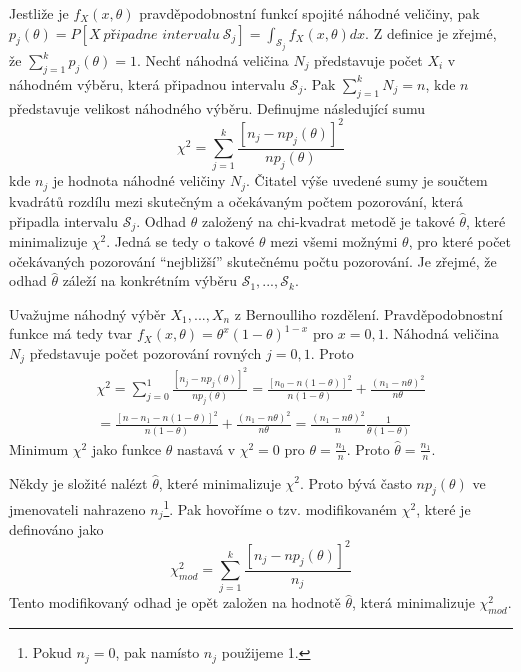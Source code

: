 Jestliže je $f_X(x, \theta)$ pravděpodobnostní funkcí spojité náhodné veličiny, pak $p_j(\theta) = P[X ~ \textit{připadne intervalu} ~ \mathscr{S}_j] = \int_{\mathscr{S}_j}f_X(x, \theta) dx$. Z definice je zřejmé, že $\sum_{j = 1}^k p_j(\theta) = 1$. Nechť náhodná veličina $N_j$ představuje počet $X_i$ v náhodném výběru, která připadnou intervalu $\mathscr{S}_j$. Pak $\sum_{j = 1}^k N_j = n$, kde $n$ představuje velikost náhodného výběru. Definujme následující sumu
\begin{equation*}
\chi^2 = \sum_{j = 1}^k \frac{[n_j - n p_j(\theta)]^2}{n p_j(\theta)}
\end{equation*}
kde $n_j$ je hodnota náhodné veličiny $N_j$. Čitatel výše uvedené sumy je součtem kvadrátů rozdílu mezi skutečným a očekávaným počtem pozorování, která připadla intervalu $\mathscr{S}_j$. Odhad $\theta$ založený na chi-kvadrat metodě je takové $\hat{\theta}$, které minimalizuje $\chi^2$. Jedná se tedy o takové $\theta$ mezi všemi možnými $\theta$, pro které počet očekávaných pozorování ``nejbližší'' skutečnému počtu pozorování. Je zřejmé, že odhad $\hat{\theta}$ záleží na konkrétním výběru $\mathscr{S}_1, ..., \mathscr{S}_k$.

\begin{example}
Uvažujme náhodný výběr $X_1, ..., X_n$ z Bernoulliho rozdělení. Pravděpodobnostní funkce má tedy tvar $f_X(x, \theta) = \theta^x(1 - \theta)^{1 - x}$ pro $x = 0, 1$. Náhodná veličina $N_j$ představuje počet pozorování rovných $j = 0, 1$. Proto
\begin{gather*}
\chi^2 = \sum_{j = 0}^1 \frac{[n_j - n p_j(\theta)]^2}{n p_j(\theta)} = \frac{[n_0 - n(1 - \theta)]^2}{n(1 - \theta)} + \frac{(n_1 - n \theta)^2}{n \theta}\\
= \frac{[n - n_1 - n(1 - \theta)]^2}{n(1 - \theta)} + \frac{(n_1 - n \theta)^2}{n \theta} = \frac{(n_1 - n \theta)^2}{n} \frac{1}{\theta(1 - \theta)}
\end{gather*}
Minimum $\chi^2$ jako funkce $\theta$ nastavá v $\chi^2 = 0$ pro $\theta = \frac{n_1}{n}$. Proto $\hat{\theta} = \frac{n_1}{n}$.
\end{example}

Někdy je složité nalézt $\hat{\theta}$, které minimalizuje $\chi^2$. Proto bývá často $n p_j(\theta)$ ve jmenovateli nahrazeno $n_j$\footnote{Pokud $n_j = 0$, pak namísto $n_j$ použijeme 1.}. Pak hovoříme o tzv. modifikovaném $\chi^2$, které je definováno jako
\begin{equation*}
\chi^2_{mod} = \sum_{j = 1}^k \frac{[n_j - np_j(\theta)]^2}{n_j}
\end{equation*}
Tento modifikovaný odhad je opět založen na hodnotě $\hat{\theta}$, která minimalizuje $\chi^2_{mod}$.

